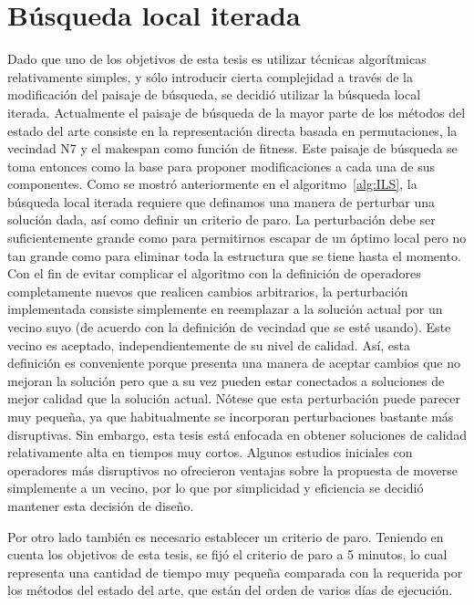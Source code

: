 \section{Búsqueda local iterada}

Dado que uno de los objetivos de esta tesis es utilizar técnicas algorítmicas relativamente simples, y sólo introducir cierta complejidad
a través de la modificación del paisaje de búsqueda, se decidió utilizar la búsqueda local iterada.
%
Actualmente el paisaje de búsqueda de la mayor parte de los métodos del estado del arte consiste en la representación directa basada en permutaciones, la vecindad N7 y el makespan como función de fitness. Este paisaje de búsqueda se toma entonces como la base para proponer modificaciones a cada una de sus componentes.
%
Como se mostró anteriormente en el algoritmo~\ref{alg:ILS}, la búsqueda local iterada requiere que definamos una manera de perturbar una 
solución dada, así como definir un criterio de paro. 
%
La perturbación debe ser suficientemente grande como para permitirnos escapar de un óptimo local pero no tan grande como para eliminar toda 
la estructura que se tiene hasta el momento.
%
Con el fin de evitar complicar el algoritmo con la definición de operadores completamente nuevos que realicen cambios arbitrarios, la 
perturbación implementada consiste simplemente en reemplazar a la solución actual por un vecino suyo (de acuerdo con la definición de vecindad 
que se esté usando). 
%
Este vecino es aceptado, independientemente de su nivel de calidad.
%
Así, esta definición es conveniente porque presenta una manera de aceptar cambios que no mejoran la solución pero que a su vez pueden estar 
conectados a soluciones de mejor calidad que la solución actual.
%
Nótese que esta perturbación puede parecer muy pequeña, ya que habitualmente se incorporan perturbaciones bastante más disruptivas.
%
Sin embargo, esta tesis está enfocada en obtener soluciones de calidad relativamente alta en tiempos muy cortos.
%
Algunos estudios iniciales con operadores más disruptivos no ofrecieron ventajas sobre la propuesta de moverse simplemente a un vecino,
por lo que por simplicidad y eficiencia se decidió mantener esta decisión de diseño.

Por otro lado también es necesario establecer un criterio de paro. 
%
Teniendo en cuenta los objetivos de esta tesis, se fijó el criterio de paro a 5 minutos, lo cual representa una cantidad de tiempo muy pequeña comparada 
con la requerida por los métodos del estado del arte, que están del orden de varios días de ejecución.

